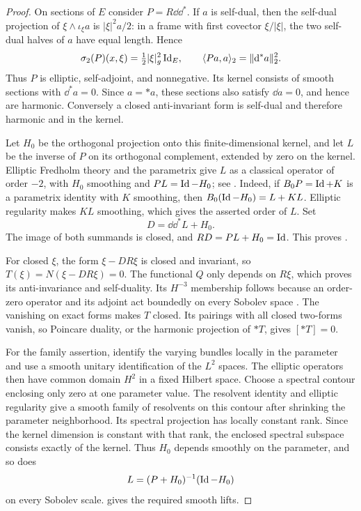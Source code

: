 \begin{proof}
On sections of $E$ consider $P=R\dd\dd^*$.  If $a$ is self-dual, then
the self-dual projection of $\xi\wedge\iota_\xi a$ is
$|\xi|^2a/2$: in a frame with first covector $\xi/|\xi|$, the two
self-dual halves of $a$ have equal length.  Hence
\[
 \sigma_2(P)(x,\xi)=\tfrac12|\xi|_g^2\operatorname{Id}_E,
 \qquad \langle Pa,a\rangle_2=\|\mathrm d^*a\|_2^2.
\]
Thus $P$ is elliptic, self-adjoint, and nonnegative.  Its kernel consists
of smooth sections with $\dd^*a=0$.  Since $a=*a$, these sections also
satisfy $\dd a=0$, and hence are harmonic.  Conversely a closed
anti-invariant form is self-dual and therefore harmonic and in the kernel.

Let $H_0$ be the orthogonal projection onto this finite-dimensional
kernel, and let $L$ be the inverse of $P$ on its orthogonal complement,
extended by zero on the kernel. Elliptic Fredholm theory and the
parametrix give $L$ as a classical operator of order $-2$, with
$H_0$ smoothing and $PL=\operatorname{Id}-H_0$; see
\cite[Sections~4--5 and~10]{TaylorPseudodifferentialNotes}.
Indeed, if $B_0P=\operatorname{Id}+K$ is a parametrix identity with $K$ smoothing,
then $B_0(\operatorname{Id}-H_0)=L+KL$. Elliptic regularity makes $KL$ smoothing,
which gives the asserted order of $L$. Set
\begin{equation}\label{eq:current-lift-definition}
 D=\dd\dd^*L+H_0.
\end{equation}
The image of both summands is closed, and
$RD=PL+H_0=\operatorname{Id}$.  This proves
.

For closed $\xi$, the form $\xi-DR\xi$ is closed and invariant, so
$T(\xi)=N(\xi-DR\xi)=0$.  The functional $Q$ only depends on $R\xi$,
which proves its anti-invariance and self-duality.  Its $H^{-3}$ membership
follows because an order-zero operator and its adjoint act boundedly on
every Sobolev space
\cite[Proposition~5.5]{TaylorPseudodifferentialNotes}.
The vanishing on exact forms makes $T$ closed.
Its pairings with all closed two-forms vanish, so Poincare duality, or the
harmonic projection of $*T$, gives $[*T]=0$.

For the family assertion, identify the varying bundles locally in the
parameter and use a smooth unitary identification of the $L^2$ spaces.
The elliptic operators then have common domain $H^2$ in a fixed
Hilbert space. Choose a spectral contour enclosing only zero at one
parameter value. The resolvent identity and elliptic regularity give
a smooth family of resolvents on this contour after shrinking the
parameter neighborhood. Its spectral projection has locally constant
rank. Since the kernel dimension is constant with that rank, the
enclosed spectral subspace consists exactly of the kernel. Thus $H_0$
depends smoothly on the parameter, and so does
\[
 L=(P+H_0)^{-1}(\operatorname{Id}-H_0)
\]
on every Sobolev scale.  gives the
required smooth lifts.
\end{proof}

